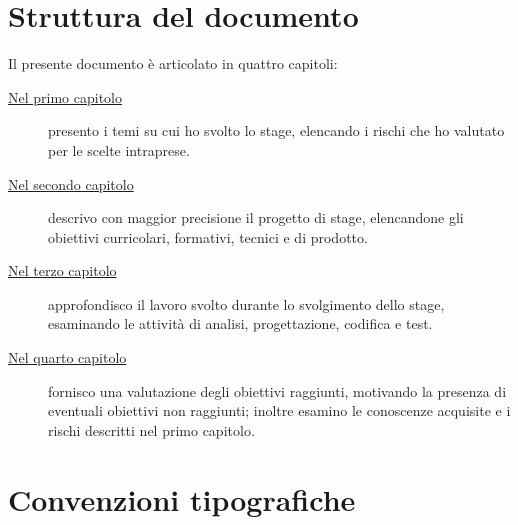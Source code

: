 
\thispagestyle{empty}

\chapter*{Struttura del documento}

Il presente documento è articolato in quattro capitoli:
\begin{description}
		\item[{\hyperref[cap:introduzione]{Nel primo capitolo}}] presento i temi su cui ho svolto lo stage, elencando i rischi che ho valutato per le scelte intraprese.

    \item[{\hyperref[cap:processi-metodologie]{Nel secondo capitolo}}] descrivo con maggior precisione il progetto di stage, elencandone gli obiettivi curricolari, formativi, tecnici e di prodotto.

    \item[{\hyperref[cap:descrizione-stage]{Nel terzo capitolo}}] approfondisco il lavoro svolto durante lo svolgimento dello stage, esaminando le attività di analisi, progettazione, codifica e test.

    \item[{\hyperref[cap:analisi-requisiti]{Nel quarto capitolo}}] fornisco una valutazione degli obiettivi raggiunti, motivando la presenza di eventuali obiettivi non raggiunti; inoltre esamino le conoscenze acquisite e i rischi descritti nel primo capitolo.

\end{description}

\let\clearpage\relax\chapter*{Convenzioni tipografiche}

